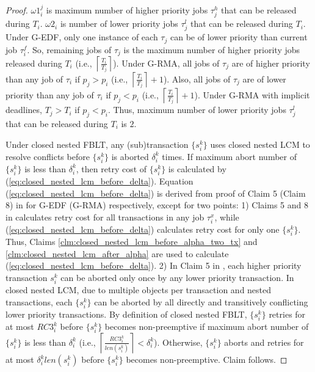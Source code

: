 \documentclass[10pt, conference, compsocconf]{IEEEtran}
\begin{document}
\begin{proof}

$\omega1_{i}^{j}$ is maximum number of higher priority jobs $\tau_{j}^{h}$
that can be released during $T_{i}$. $\omega2_{i}$ is number of
lower priority jobs $\tau_{j}^{l}$ that can be released during $T_{i}$.
Under G-EDF, only one instance of each $\tau_{j}$ can be of lower
priority than current job $\tau_{i}^{f}$. So, remaining jobs of $\tau_{j}$
is the maximum number of higher priority jobs released during $T_{i}$
(i.e., $\left\lceil \frac{T_{i}}{T_{j}}\right\rceil $). Under G-RMA,
all jobs of $\tau_{j}$ are of higher priority than any job of $\tau_{i}$
if $p_{j}>p_{i}$ (i.e., $\left\lceil \frac{T_{i}}{T_{j}}\right\rceil +1$).
Also, all jobs of $\tau_{j}$ are of lower priority than any job of
$\tau_{i}$ if $p_{j}<p_{i}$ (i.e., $\left\lceil \frac{T_{i}}{T_{j}}\right\rceil +1$).
Under G-RMA with implicit deadlines, $T_{j}>T_{i}$ if $p_{j}<p_{i}$.
Thus, maximum number of lower priority jobs $\tau_{j}^{l}$ that can
be released during $T_{i}$ is $2$.

Under closed nested FBLT, any (sub)transaction $\{s_{i}^{k}\}$ uses
closed nested LCM to resolve conflicts before $\{s_{i}^{k}\}$ is
aborted $\delta_{i}^{k}$ times. If maximum abort number of $\{s_{i}^{k}\}$
is less than $\delta_{i}^{k}$, then retry cost of $\{s_{i}^{k}\}$
is calculated by (\ref{eq:closed_nested_lcm_before_delta}). Equation
(\ref{eq:closed_nested_lcm_before_delta}) is derived from proof of
Claim 5 (Claim 8) in \cite{lcmdac2012} for G-EDF (G-RMA) respectively,
except for two points: 1) Claims 5 and 8 in \cite{lcmdac2012} calculates
retry cost for all transactions in any job $\tau_{i}^{x}$, while
(\ref{eq:closed_nested_lcm_before_delta}) calculates retry cost for
only one $\{s_{i}^{k}\}$. Thus, Claims \ref{clm:closed_nested_lcm_before_alpha_two_tx}
and \ref{clm:closed_nested_lcm_after_alpha} are used to calculate
(\ref{eq:closed_nested_lcm_before_delta}). 2) In Claim 5 in \cite{lcmdac2012},
each higher priority transaction $s_{i}^{k}$ can be aborted only
once by any lower priority transaction. In closed nested LCM, due
to multiple objects per transaction and nested transactions, each
$\{s_{i}^{k}\}$ can be aborted by all directly and transitively conflicting
lower priority transactions. By definition of closed nested FBLT,
$\{s_{i}^{k}\}$ retries for at most $RC3_{i}^{k}$ before $\{s_{i}^{k}\}$
becomes non-preemptive if maximum abort number of $\{s_{i}^{k}\}$
is less than $\delta_{i}^{k}$ (i.e., $\left\lceil \frac{RC3_{i}^{k}}{len\left(s_{i}^{k}\right)}\right\rceil <\delta_{i}^{k}$).
Otherwise, $\{s_{i}^{k}\}$ aborts and retries for at most $\delta_{i}^{k}len\left(s_{i}^{k}\right)$
before $\{s_{i}^{k}\}$ becomes non-preemptive. Claim follows.

\end{proof}
\end{document}
